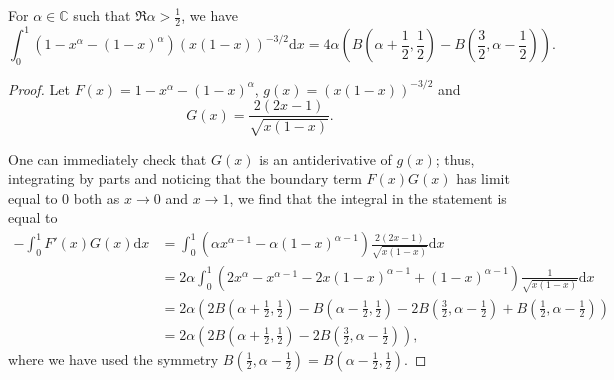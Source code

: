 \documentclass[10pt,a4paper]{amsart}
\newcommand{\dd}{\mathrm{d}}
\begin{document}
\begin{lem}\label{lemma:MysteriousPiece}
For $\alpha\in\mathbb{C}$ such that $\Re \alpha > \frac{1}{2}$, we have
\[
\int_0^1 (1-x^\alpha-(1-x)^\alpha) (x(1-x))^{-3/2} \dd x = 4\alpha \left( B\left(\alpha+\frac{1}{2}, \frac{1}{2}\right)  -B\left(\frac{3}{2}, \alpha-\frac{1}{2}\right) \right).
\]
\end{lem}

\begin{proof}
    Let $F(x)=1-x^\alpha-(1-x)^\alpha$, $g(x)=(x(1-x))^{-3/2}$ and
    \[
        G(x) = \frac{2(2x-1)}{\sqrt{x(1-x)}}.
    \]

One can immediately check that $G(x)$ is an antiderivative of $g(x)$; 
    thus, integrating by parts and noticing that the boundary term $F(x)G(x)$ has limit equal to $0$ both as $x \to 0$ and $x \to 1$, we find that the integral in the statement is equal to
    \[
    \begin{aligned}
    -\int_0^1 F'(x) G(x) \dd x & =
\int_0^1 \left(\alpha x^{\alpha-1}-\alpha (1-x)^{\alpha-1}\right) \frac{2(2x-1)}{\sqrt{x(1-x)}} \dd x  \\
& = 2\alpha \int_0^1 \left( 2x^{\alpha} -x^{\alpha-1}-2x(1-x)^{\alpha-1} + (1-x)^{\alpha-1} \right) \frac{1}{\sqrt{x(1-x)}} \dd x \\
& = 2\alpha \left( 2B\left(\alpha+\frac{1}{2}, \frac{1}{2}\right) - B\left(\alpha-\frac{1}{2}, \frac{1}{2}\right) -2B\left(\frac{3}{2}, \alpha-\frac{1}{2}\right)+B\left(\frac{1}{2},\alpha-\frac{1}{2}\right) \right) \\
& = 2\alpha \left( 2B\left(\alpha+\frac{1}{2}, \frac{1}{2}\right)  -2B\left(\frac{3}{2}, \alpha-\frac{1}{2}\right) \right),
\end{aligned}
    \]
    where we have used the symmetry $B\left(\frac{1}{2},\alpha-\frac{1}{2}\right)=B\left(\alpha-\frac{1}{2}, \frac{1}{2}\right)$.
\end{proof}
\end{document}
